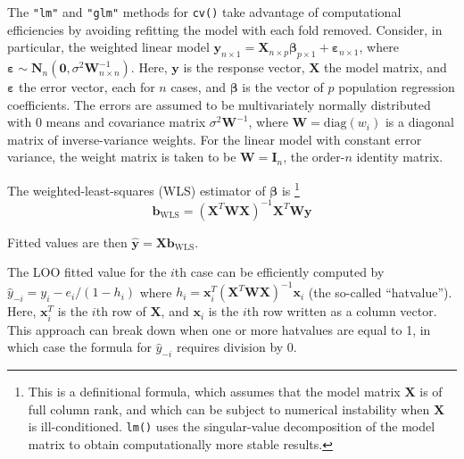 \documentclass[
]{jss}
\begin{document}
The \texttt{"lm"} and \texttt{"glm"} methods for \texttt{cv()} take
advantage of computational efficiencies by avoiding refitting the model
with each fold removed. Consider, in particular, the weighted linear
model
\(\mathbf{y}_{n \times 1} = \mathbf{X}_{n \times p}\boldsymbol{\beta}_{p \times 1} + \boldsymbol{\varepsilon}_{n \times 1}\),
where
\(\boldsymbol{\varepsilon} \sim \mathbf{N}_n \left(\mathbf{0}, \sigma^2 \mathbf{W}^{-1}_{n \times n}\right)\).
Here, \(\mathbf{y}\) is the response vector, \(\mathbf{X}\) the model
matrix, and \(\boldsymbol{\varepsilon}\) the error vector, each for
\(n\) cases, and \(\boldsymbol{\beta}\) is the vector of \(p\)
population regression coefficients. The errors are assumed to be
multivariately normally distributed with 0 means and covariance matrix
\(\sigma^2 \mathbf{W}^{-1}\), where \(\mathbf{W} = \mathrm{diag}(w_i)\)
is a diagonal matrix of inverse-variance weights. For the linear model
with constant error variance, the weight matrix is taken to be
\(\mathbf{W} = \mathbf{I}_n\), the order-\(n\) identity matrix.

The weighted-least-squares (WLS) estimator of \(\boldsymbol{\beta}\) is
\citep[see, e.g.,][Sec. 12.2.2]{Fox:2016} \footnote{This is a
  definitional formula, which assumes that the model matrix
  \(\mathbf{X}\) is of full column rank, and which can be subject to
  numerical instability when \(\mathbf{X}\) is ill-conditioned.
  \texttt{lm()} uses the singular-value decomposition of the model
  matrix to obtain computationally more stable results.} \[
\mathbf{b}_{\mathrm{WLS}} = \left( \mathbf{X}^T \mathbf{W} \mathbf{X} \right)^{-1} 
  \mathbf{X}^T \mathbf{W} \mathbf{y}
\]

Fitted values are then
\(\widehat{\mathbf{y}} = \mathbf{X}\mathbf{b}_{\mathrm{WLS}}\).

The LOO fitted value for the \(i\)th case can be efficiently computed by
\(\widehat{y}_{-i} = y_i - e_i/(1 - h_i)\) where
\(h_i = \mathbf{x}^T_i \left( \mathbf{X}^T \mathbf{W} \mathbf{X} \right)^{-1} \mathbf{x}_i\)
(the so-called ``hatvalue''). Here, \(\mathbf{x}^T_i\) is the \(i\)th
row of \(\mathbf{X}\), and \(\mathbf{x}_i\) is the \(i\)th row written
as a column vector. This approach can break down when one or more
hatvalues are equal to 1, in which case the formula for
\(\widehat{y}_{-i}\) requires division by 0.
\end{document}
